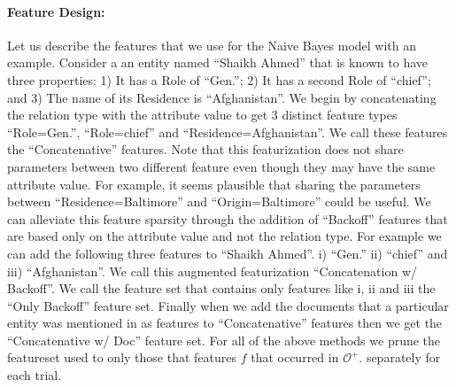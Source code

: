 \documentclass[paper=a4,fontsize=11pt]{scrartcl}
\numberwithin{equation}{section}    %
\numberwithin{figure}{section}      %
\numberwithin{table}{section}       %
\begin{document}
\paragraph{Feature Design:}\label{sec:nb-feature-design}
Let us describe the features that we use for the Naive Bayes model with an example.
Consider a an entity named ``Shaikh Ahmed'' that is known to have three properties:
1) It has a Role of ``Gen.'';
2) It has a second Role of ``chief''; and
3) The name of its Residence is ``Afghanistan''.
We begin by concatenating the relation type with the attribute value to get 3 distinct feature types
``Role=Gen.'', ``Role=chief'' and ``Residence=Afghanistan''.
We call these features the ``Concatenative'' features.
Note that this featurization does not share parameters between two different feature even though they may have the same attribute value. For example, it seems plausible that sharing the parameters between ``Residence=Baltimore'' and ``Origin=Baltimore'' could be useful.
We can alleviate this feature sparsity through the addition of ``Backoff'' features
that are based only on the attribute value and not the relation type.
For example we can add the following three features
to ``Shaikh Ahmed''. i) ``Gen.'' ii) ``chief'' and iii) ``Afghanistan''.
We call this augmented featurization ``Concatenation w/ Backoff''.
We call the feature set that  contains only features like i, ii and iii the ``Only Backoff'' feature set.
Finally when we add the documents that a particular entity was mentioned in as features to
``Concatenative'' features then we get the ``Concatenative w/ Doc'' feature set.
For all of the above methods we prune the featureset used to only those that features $f$ that occurred in $\mathcal{O}^{+}$.
separately for each trial.

\end{document}
